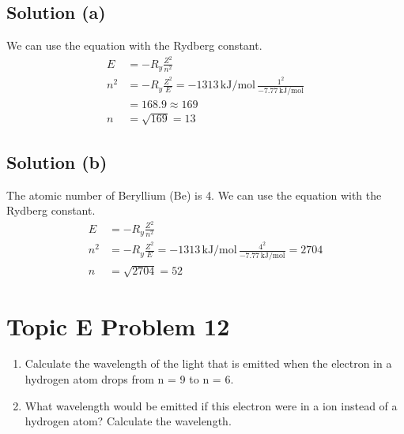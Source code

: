 \documentclass[10pt]{article}
\begin{document}
        \subsection{Solution (a)}
            We can use the equation with the Rydberg constant.
            \begin{align}
                E   &=  -R_y \frac{Z^2}{n^2}\\
                n^2 &=  -R_y \frac{Z^2}{E}
                    =   -1313\,\unit{\kilo\joule/\mole}\,\frac{1^2}{-7.77\,\unit{\kilo\joule/\mole}}\\
                    &=  168.9
                    \approx 169\\
                n   &=  \sqrt{169}
                    =   \boxed{13}
            \end{align}

        \subsection{Solution (b)}
            The atomic number of Beryllium (Be) is 4.
            We can use the equation with the Rydberg constant.
            \begin{align}
                E   &=  -R_y \frac{Z^2}{n^2}\\
                n^2 &=  -R_y \frac{Z^2}{E}
                    =   -1313\,\unit{\kilo\joule/\mole}\,\frac{4^2}{-7.77\,\unit{\kilo\joule/\mole}}
                    =   2704\\
                n   &=  \sqrt{2704}
                    =   \boxed{52}
            \end{align}

    \pagebreak
    \section{Topic E Problem 12}
        \begin{enumerate}[label=\alph*)]
            \item   Calculate the wavelength of the light that is emitted when the electron in a hydrogen atom drops from n = 9 to n = 6.
            \item   What wavelength would be emitted if this electron were in a  ion instead of a hydrogen atom? Calculate the wavelength.
        \end{enumerate}
\end{document}
